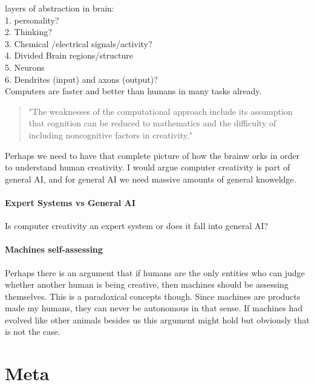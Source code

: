 layers of abstraction in brain:\\
1.	personality?\\
2.	Thinking?\\
3.	Chemical /electrical signals/activity?\\
4.	Divided Brain regions/structure\\
5.	Neurons\\
6.	Dendrites (input) and axons (output)?\\


Computers are faster and better than humans in many tasks already.

\begin{quote}
"The weaknesses of the computational approach include its assumption that cognition can be reduced to mathematics and the difficulty of including noncognitive factors in creativity." \autocite[p.457]{Mayer1999}
\end{quote}


Perhaps we need to have that complete picture of how the brainw orks in order to understand human creativity. I would argue computer creativity is part of general \ac{AI}, and for general \ac{AI} we need massive amounts of general knoweldge.
\paragraph{Expert Systems vs General AI}
Is computer creativity an expert system or does it fall into general \ac{AI}? 

\paragraph{Machines self-assessing}
Perhaps there is an argument that if humans are the only entities who can judge whether another human is being creative, then machines should be assessing themselves. This is a paradoxical concepts though. Since machines are products made my humans, they can never be autonomous in that sense. If machines had evolved like other animals besides us this argument might hold but obviously that is not the case.



\section{Meta}

